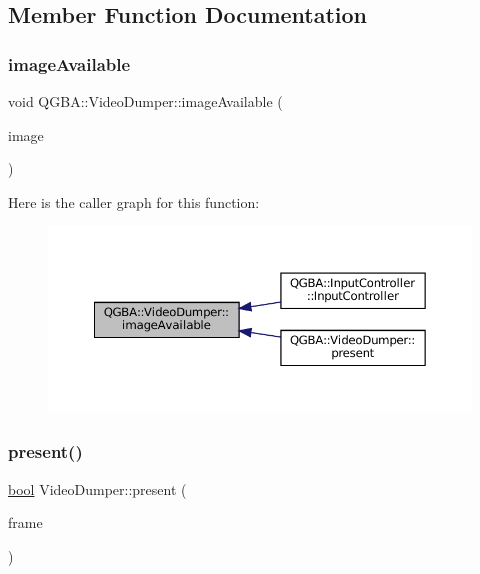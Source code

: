 \subsection{Member Function Documentation}
\mbox{\label{class_q_g_b_a_1_1_video_dumper_a55c04c35b9546f1e6e05b5334911df7e}} 
\subsubsection{\texorpdfstring{image\+Available}{imageAvailable}}
{\footnotesize\ttfamily void Q\+G\+B\+A\+::\+Video\+Dumper\+::image\+Available (\begin{DoxyParamCaption}\item[{const Q\+Image \&}]{image }\end{DoxyParamCaption})\hspace{0.3cm}{\ttfamily [signal]}}

Here is the caller graph for this function\+:
\nopagebreak
\begin{figure}[H]
\begin{center}
\leavevmode
\includegraphics[width=350pt]{class_q_g_b_a_1_1_video_dumper_a55c04c35b9546f1e6e05b5334911df7e_icgraph}
\end{center}
\end{figure}
\mbox{\label{class_q_g_b_a_1_1_video_dumper_aeaf11360320d28e118e8f1327cf915ea}} 
\subsubsection{\texorpdfstring{present()}{present()}}
{\footnotesize\ttfamily \mbox{\hyperlink{libretro_8h_a4a26dcae73fb7e1528214a068aca317e}{bool}} Video\+Dumper\+::present (\begin{DoxyParamCaption}\item[{const Q\+Video\+Frame \&}]{frame }\end{DoxyParamCaption})\hspace{0.3cm}{\ttfamily [override]}}

